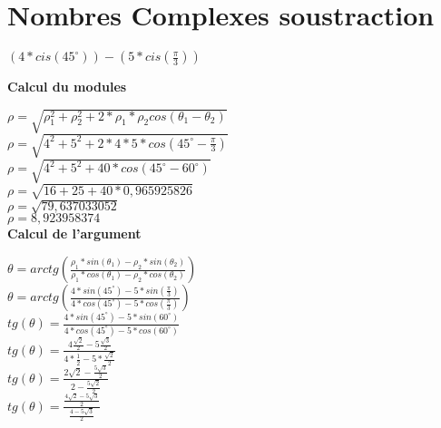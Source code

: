 \newpage
\section{Nombres Complexes soustraction}
\vspace{3mm} %

$(4 * cis(45^{\circ} )) - (5 * cis(\frac{\pi}{3}))$


\vspace{6mm}
\textbf{Calcul du modules}
\vspace{5mm}

$\rho = \sqrt{\rho_{1}^{2} + \rho_{2}^{2} + 2*\rho_{1}*\rho_{2} cos(\theta_{1} -  \theta_{2})}$ \\

$\rho = \sqrt{4^{2} + 5^{2} +2*4*5* cos(45^{\circ} - \frac{\pi}{3})}$ \\

$\rho = \sqrt{4^{2} + 5^{2} + 40* cos(45^{\circ} - 60^{\circ})}$ \\

$\rho = \sqrt{16 + 25 + 40* 0,965925826}$ \\

$\rho = \sqrt{79,637033052}$ \\

$\rho = 8,923958374$ \\

\vspace{4mm}
\textbf{Calcul de l'argument}
\vspace{5mm}

$\theta = arctg(\frac{\rho_{1}*sin(\theta_{1}) - \rho_{2}*sin(\theta_{2})}{\rho_{1}*cos(\theta_{1}) - \rho_{2}*cos(\theta_{2})})$ \\

$\theta = arctg(\frac{4*sin(45^{\circ}) - 5*sin(\frac{\pi}{3})}{4*cos(45^{\circ}) - 5*cos(\frac{\pi}{3})})$ \\

$tg(\theta) = \frac{4*sin(45^{\circ}) - 5*sin(60^{\circ})}{4*cos(45^{\circ}) - 5*cos(60^{\circ})}$ \\

$tg(\theta) = \frac{4\frac{\sqrt{2}}{2} - 5\frac{\sqrt{3}}{2} } {4*\frac{1}{2} - 5 * \frac{\sqrt{2}}{2}}$ \\

$tg(\theta) = \frac{2\sqrt{2} - \frac{5\sqrt{3}}{2} } {2 - \frac{5\sqrt{2}}{2} }$ \\

$tg(\theta) = \frac{\frac{4\sqrt{2} - 5\sqrt{3}}{2}} {\frac{4 - 5\sqrt{3}}{2} }$ \\

